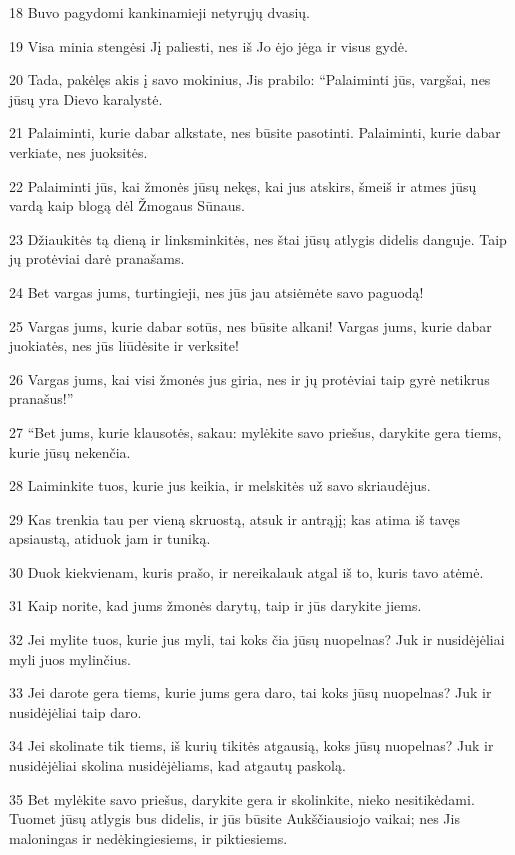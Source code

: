 \par 18 Buvo pagydomi kankinamieji netyrųjų dvasių. 
\par 19 Visa minia stengėsi Jį paliesti, nes iš Jo ėjo jėga ir visus gydė. 
\par 20 Tada, pakėlęs akis į savo mokinius, Jis prabilo: “Palaiminti jūs, vargšai, nes jūsų yra Dievo karalystė. 
\par 21 Palaiminti, kurie dabar alkstate, nes būsite pasotinti. Palaiminti, kurie dabar verkiate, nes juoksitės. 
\par 22 Palaiminti jūs, kai žmonės jūsų nekęs, kai jus atskirs, šmeiš ir atmes jūsų vardą kaip blogą dėl Žmogaus Sūnaus. 
\par 23 Džiaukitės tą dieną ir linksminkitės, nes štai jūsų atlygis didelis danguje. Taip jų protėviai darė pranašams. 
\par 24 Bet vargas jums, turtingieji, nes jūs jau atsiėmėte savo paguodą! 
\par 25 Vargas jums, kurie dabar sotūs, nes būsite alkani! Vargas jums, kurie dabar juokiatės, nes jūs liūdėsite ir verksite! 
\par 26 Vargas jums, kai visi žmonės jus giria, nes ir jų protėviai taip gyrė netikrus pranašus!” 
\par 27 “Bet jums, kurie klausotės, sakau: mylėkite savo priešus, darykite gera tiems, kurie jūsų nekenčia. 
\par 28 Laiminkite tuos, kurie jus keikia, ir melskitės už savo skriaudėjus. 
\par 29 Kas trenkia tau per vieną skruostą, atsuk ir antrąjį; kas atima iš tavęs apsiaustą, atiduok jam ir tuniką. 
\par 30 Duok kiekvienam, kuris prašo, ir nereikalauk atgal iš to, kuris tavo atėmė. 
\par 31 Kaip norite, kad jums žmonės darytų, taip ir jūs darykite jiems. 
\par 32 Jei mylite tuos, kurie jus myli, tai koks čia jūsų nuopelnas? Juk ir nusidėjėliai myli juos mylinčius. 
\par 33 Jei darote gera tiems, kurie jums gera daro, tai koks jūsų nuopelnas? Juk ir nusidėjėliai taip daro. 
\par 34 Jei skolinate tik tiems, iš kurių tikitės atgausią, koks jūsų nuopelnas? Juk ir nusidėjėliai skolina nusidėjėliams, kad atgautų paskolą. 
\par 35 Bet mylėkite savo priešus, darykite gera ir skolinkite, nieko nesitikėdami. Tuomet jūsų atlygis bus didelis, ir jūs būsite Aukščiausiojo vaikai; nes Jis maloningas ir nedėkingiesiems, ir piktiesiems. 
